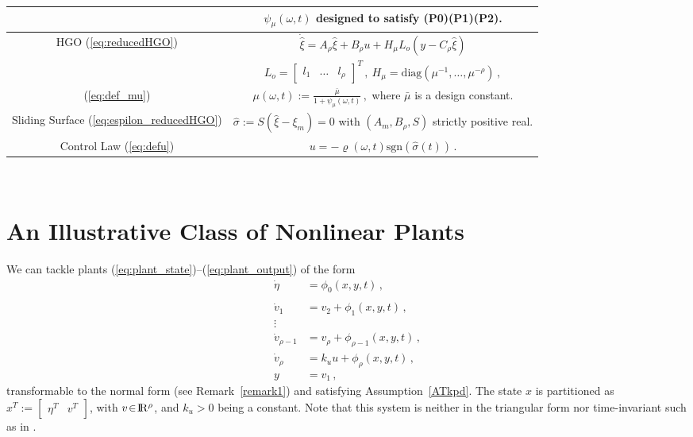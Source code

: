 \documentclass{rncauth}
\def\re{{\rm I}\! {\rm R}}
\begin{document}
\begin{table*}[thbl]
\begin{center}
\begin{small}
\begin{tabular}{|c|c|}
& $\psi_\mu(\omega,t)$ designed to satisfy (P0)(P1)(P2). \\
     \hline


        HGO (\ref{eq:reducedHGO}) &  $\dot{\hat{\xi}} = A_\rho \hat{\xi} +  B_\rho u + H_\mu L_o  (y - C_\rho \hat{\xi})$ \\ 
        
        & $L_o = [\begin{array}{ccc} l_{1} & \ldots &
l_{\rho}\end{array}]^T\,, \ H_\mu = \mbox{diag}(\mu^{-1},\ldots,\mu^{-\rho})\,,$\\


(\ref{eq:def_mu}) & $\mu(\omega,t):=\frac{\bar{\mu}}{1+\psi_\mu(\omega,t)}\,,$ where $\bar\mu$ is a design constant. \\[1mm]
\hline


     Sliding Surface  (\ref{eq:espilon_reducedHGO}) & $\hat{\sigma} := S (\hat{\xi}-\xi_m)=0$ with $(A_m,B_\rho,S)$
     strictly positive real.\\
     \hline

     Control Law  (\ref{eq:defu})       & $u = -\varrho(\omega,t)\mbox{sgn}(\hat{\sigma}(t))\,.$\\
     \hline
  \end{tabular} \\
\end{small}
\end{center}
\renewcommand {\arraystretch}{1}
\end{table*}
%



\section{An Illustrative Class of Nonlinear Plants\label{sec:classex}}

We can tackle plants
(\ref{eq:plant_state})--(\ref{eq:plant_output}) of the form
%
\begin{align}
\dot{\eta}&=\phi_0(x,y,t)\,,
\label{eq:partitioneta} \\
\nonumber\\
\dot{v}_1&=v_2 + \phi_{1}(x,y,t)\,,
\nonumber \\
\vdots & \label{eq:partitionvartheta} \\
\dot{v}_{\rho-1}&=v_{\rho} + \phi_{\rho-1}(x,y,t)\,,\nonumber\\
\dot{v}_\rho&= k_u u + \phi_{\rho}(x,y,t)\,,\nonumber \\
y&=v_1\,,\nonumber
\end{align}
%
transformable to the normal form (see Remark~\ref{remark1}) and
satisfying Assumption~\ref{ATkpd}. The state $x$ is partitioned as
$x^T\!:=\![\begin{array}{cc}\eta^T & v^T\end{array}]$, with
$v\!\in\!\re^{\rho}$, and $k_u\!>\!0$ being a constant. Note that
this system is neither in the triangular form nor time-invariant
such as in \cite{PJ:04}.
\end{document}
